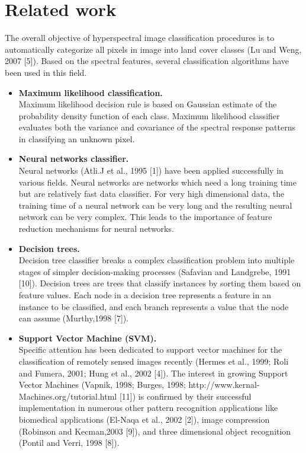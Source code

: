 \documentclass[11pt]{article}
\begin{document}
\section{Related work}
The overall objective of hyperspectral image classification procedures is to automatically categorize all pixels in image into land cover classes (Lu  and Weng, 2007 [5]). Based on the spectral features, several classification algorithms have been used in this field.

\begin{itemize}
\item {\bf Maximum likelihood classification.} \\
Maximum likelihood decision rule is based on Gaussian estimate of the probability density function of each class. Maximum likelihood classifier evaluates both the variance and covariance of the spectral response patterns in classifying an unknown pixel.
\item {\bf Neural networks classifier. } \\
Neural networks (Atli.J et al., 1995 [1]) have been applied successfully in various fields. Neural networks are networks which need a long training time but are relatively fast data classifier. For very high dimensional data, the training time of a neural network can be very long and the resulting neural network can be very complex. This leads to the importance of feature reduction mechanisms for neural networks.
\item {\bf Decision trees. }\\
Decision tree classifier breaks a complex classification problem into multiple stages of simpler decision-making processes (Safavian and Landgrebe, 1991 [10]). Decision trees are trees that classify instances by sorting them based on feature values. Each node in a decision tree represents a feature in an instance to be classified, and each branch represents a value that the node can assume (Murthy,1998 [7]).
\item {\bf Support Vector Machine (SVM).}\\
Specific attention has been dedicated to support vector machines for the classification of remotely sensed images recently (Hermes et al., 1999; Roli and Fumera, 2001; Hung et al., 2002 [4]). The interest in growing Support Vector Machines (Vapnik, 1998; Burges, 1998; http://www.kernal-Machines.org/tutorial.html [11]) is confirmed by their successful implementation in numerous other pattern recognition applications like biomedical applications (El-Naqa et al., 2002 [2]), image compression (Robinson and Kecman,2003 [9]), and three dimensional object recognition (Pontil and Verri, 1998 [8]).

\end{itemize}
\end{document}
